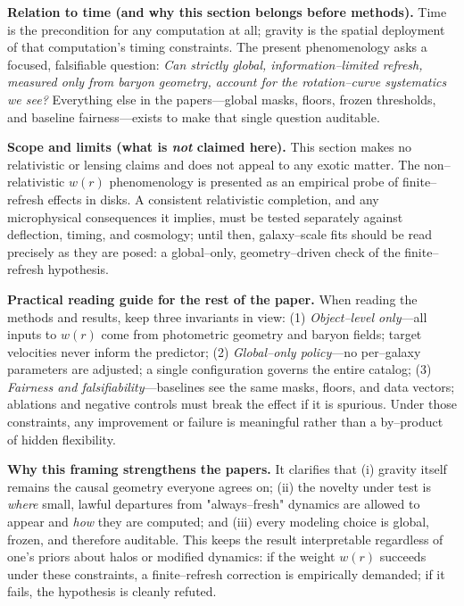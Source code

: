 \documentclass[usenatbib]{mnras}
\begin{document}
\vspace{0.5em}
\noindent\textbf{Relation to time (and why this section belongs before methods).}
Time is the precondition for any computation at all; gravity is the spatial deployment of that computation's timing constraints. The present phenomenology asks a focused, falsifiable question: \emph{Can strictly global, information–limited refresh, measured only from baryon geometry, account for the rotation–curve systematics we see?}
Everything else in the papers—global masks, floors, frozen thresholds, and baseline fairness—exists to make that single question auditable.

\vspace{0.5em}
\noindent\textbf{Scope and limits (what is \emph{not} claimed here).}
This section makes no relativistic or lensing claims and does not appeal to any exotic matter. The non–relativistic \(w(r)\) phenomenology is presented as an empirical probe of finite–refresh effects in disks. A consistent relativistic completion, and any microphysical consequences it implies, must be tested separately against deflection, timing, and cosmology; until then, galaxy–scale fits should be read precisely as they are posed: a global–only, geometry–driven check of the finite–refresh hypothesis.

\vspace{0.5em}
\noindent\textbf{Practical reading guide for the rest of the paper.}
When reading the methods and results, keep three invariants in view:
(1) \emph{Object–level only}—all inputs to \(w(r)\) come from photometric geometry and baryon fields; target velocities never inform the predictor;
(2) \emph{Global–only policy}—no per–galaxy parameters are adjusted; a single configuration governs the entire catalog;
(3) \emph{Fairness and falsifiability}—baselines see the same masks, floors, and data vectors; ablations and negative controls must break the effect if it is spurious.
Under those constraints, any improvement or failure is meaningful rather than a by–product of hidden flexibility.

\vspace{0.5em}
\noindent\textbf{Why this framing strengthens the papers.}
It clarifies that (i) gravity itself remains the causal geometry everyone agrees on; (ii) the novelty under test is \emph{where} small, lawful departures from "always–fresh" dynamics are allowed to appear and \emph{how} they are computed; and (iii) every modeling choice is global, frozen, and therefore auditable.
This keeps the result interpretable regardless of one's priors about halos or modified dynamics: if the weight \(w(r)\) succeeds under these constraints, a finite–refresh correction is empirically demanded; if it fails, the hypothesis is cleanly refuted.
\end{document}
